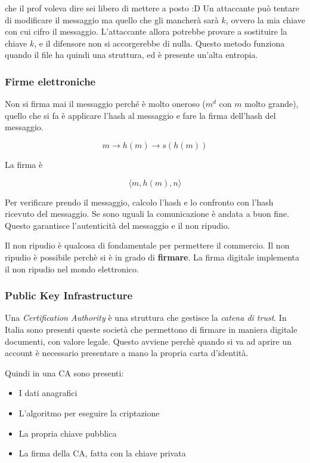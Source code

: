 che il prof voleva dire sei libero di mettere a posto :D
Un attaccante può tentare di modificare il messaggio ma quello che gli mancherà 
sarà $k$, ovvero la mia chiave con cui cifro il messaggio.
L'attaccante allora potrebbe provare a sostituire la chiave $k$, e il difensore 
non si accorgerebbe di nulla. Questo metodo funziona quando il file ha quindi 
una struttura, ed è presente un'alta entropia.


\subsubsection{Firme elettroniche}

Non si firma mai il messaggio perché è molto oneroso ($m^d$ con $m$ molto 
grande), quello che si fa è applicare l'hash al messaggio e fare la firma 
dell'hash del messaggio.

$$
m \rightarrow h(m) \rightarrow s(h(m))
$$

La firma è

$$
\langle m, h(m), n \rangle
$$

Per verificare prendo il messaggio, calcolo l'hash e lo confronto con l'hash 
ricevuto del messaggio. Se sono uguali la comunicazione è andata a buon fine. 
Questo garantisce l'autenticità del messaggio e il non ripudio.

Il non ripudio è qualcosa di fondamentale per permettere il commercio. Il non 
ripudio è possibile perchè si è in grado di \textbf{firmare}. La firma digitale 
implementa il non ripudio nel mondo elettronico.

\subsubsection{Public Key Infrastructure}


Una \textit{Certification Authority} è una struttura che gestisce la 
\textit{catena di trust}. In Italia sono presenti queste società che permettono 
di firmare in maniera digitale documenti, con valore legale. Questo avviene 
perchè quando si va ad aprire un account è necessario presentare a mano la 
propria carta d'identità.

Quindi in una CA sono presenti:
\begin{itemize}
\item I dati anagrafici
\item L'algoritmo per eseguire la criptazione
\item La propria chiave pubblica
\item La firma della CA, fatta con la chiave privata
\end{itemize}

